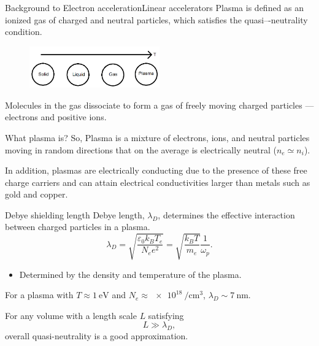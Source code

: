 \documentclass[]{beamer}
\begin{document}
\newcommand{\whatisplasma}{What plasma is?}
\begin{frame}{Background to Electron acceleration}{Linear accelerators}
Plasma is defined as an ionized gas of charged and neutral particles, which  satisfies  the quasi–-neutrality condition.
\begin{figure}
    \centering
    \includegraphics[width=0.5\textwidth]{figures/temp_and_states.png}
\end{figure}
Molecules in the gas dissociate to form a gas of freely moving charged particles --- electrons and positive ions.
\end{frame}
\begin{frame}{\whatisplasma}
So, Plasma is a mixture of electrons, ions, and neutral particles moving in random directions that on the average is electrically neutral ($n_e \simeq n_i$).

In addition, plasmas are electrically conducting due to the presence of these free charge carriers and can attain electrical conductivities larger than metals such as gold and copper.
\end{frame}
\newcommand{\debye}{Debye shielding length}
\begin{frame}{\debye}
  Debye length, $\lambda_D$, determines the effective interaction between charged particles in a plasma.
  \begin{equation*}
\lambda_D=\sqrt{\frac{\varepsilon_0 k_B T_e}{N_e e^2}}=\sqrt{\frac{k_B T}{m_e}}\frac{1}{\omega_p}.
\end{equation*}
\begin{itemize}
  \item Determined by the density and temperature of the plasma.
\end{itemize}
For a plasma with $T\approx \SI{1}{\eV}$ and $N_e\approx \SI{e18}{\per\cubic\cm}$, $\lambda_D\sim \SI{7}{\nm}$.

For any volume with a length scale $L$ satisfying 
\begin{equation*}
L \gg \lambda_D,
\label{eq:quasiNeutrality}
\end{equation*}
overall quasi-neutrality is a good approximation.
\end{frame}
\end{document}
